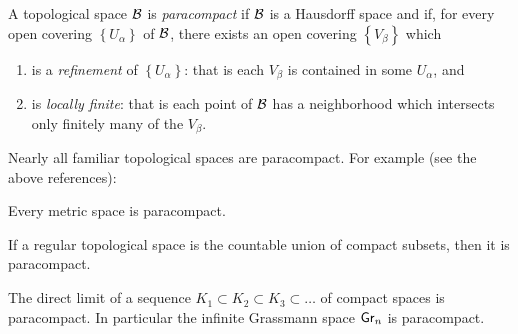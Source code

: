 \begin{definition}\label{def:5-4}
	A topological space $\mathcal{B} $ is \textit{paracompact} if $\mathcal{B} $ is a Hausdorff space and if, for every open covering $\left\{U_{\alpha}\right\}$ of $\mathcal{B} $, there exists an open covering $\left\{V_{\beta}\right\}$ which
	\begin{enumerate}[label=\arabic*),leftmargin=2\parindent ]
		\item is a \textit{refinement} of $\left\{U_{\alpha}\right\}$: that is each $V_{\beta}$ is contained in some $U_{\alpha}$, and
		\item is \textit{locally finite}: that is each point of $\mathcal{B} $ has a neighborhood which intersects only finitely many of the $V_{\beta}$.
	\end{enumerate}
\end{definition}

Nearly all familiar topological spaces are paracompact. For example (see the above references):
\begin{theorem}[A. H. Stone]\label{thm-5-8}
Every metric space is paracompact.	
\end{theorem}
\begin{theorem}[Morita]\label{thm-5-9}
	If a regular topological space is the countable union of compact subsets, then it is paracompact.
\end{theorem}
\begin{corollary}\label{cor-5-9}
	The direct limit of a sequence $K_{1} \subset K_{2} \subset K_{3} \subset \dots$ of compact spaces is paracompact. In particular the infinite Grassmann space $\grass{n}{}$ is paracompact.
\end{corollary}

